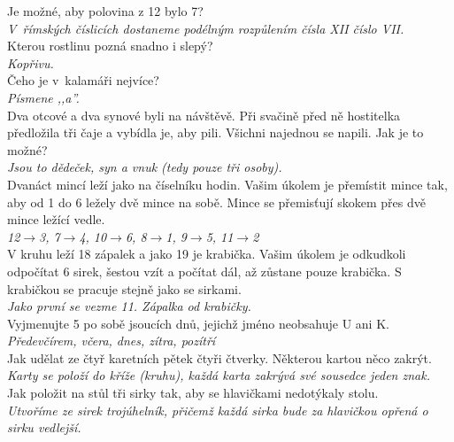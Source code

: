 \begin{multicols}{\value{columnsgames}}
\noindent
Je možné, aby polovina z 12 bylo 7?\\[1 mm]
{\sl V~římských číslicích dostaneme podélným rozpůlením 
čísla XII číslo VII.}\\

\noindent
Kterou rostlinu pozná snadno i slepý?\\[1 mm]
{\sl Kopřivu.}\\

\noindent
Čeho je v~kalamáři nejvíce?\\[1 mm]
{\sl Písmene ,,a''.}\\

\noindent
Dva otcové a dva synové byli na návštěvě. Při svačině 
před ně hostitelka předložila tři čaje a vybídla je, aby pili. 
Všichni najednou se napili. Jak je to možné?\\[1 mm]
{\sl Jsou to dědeček, syn a vnuk (tedy pouze tři osoby).}\\

\noindent
Dvanáct mincí leží jako na číselníku hodin. Vašim úkolem je 
přemístit mince tak, aby od 1 do 6 ležely dvě mince na sobě. 
Mince se přemisťují skokem přes dvě mince ležící vedle.\\[1 mm]
{\sl 12$\rightarrow$3, 7$\rightarrow$4, 10$\rightarrow$6, 8$\rightarrow$1, 
9$\rightarrow$5, 11$\rightarrow$2}\\

\noindent
V kruhu leží 18 zápalek a jako 19 je krabička. Vašim úkolem 
je odkudkoli odpočítat 6 sirek, šestou vzít a počítat dál, až 
zůstane pouze krabička. S krabičkou se pracuje stejně jako se 
sirkami.\\[1 mm]
{\sl Jako první se vezme 11. Zápalka od krabičky.}\\

\noindent
Vyjmenujte 5 po sobě jsoucích dnů, jejichž jméno neobsahuje 
U ani K.\\[1 mm]
{\sl Předevčírem, včera, dnes, zítra, pozítří}\\

\noindent
Jak udělat ze čtyř karetních pětek čtyři čtverky. Některou 
kartou něco zakrýt.\\[1 mm]
{\sl Karty se položí do kříže (kruhu), každá karta zakrývá své 
sousedce jeden znak.}\\

\noindent
Jak položit na stůl tři sirky tak, aby se hlavičkami 
nedotýkaly stolu.\\[1 mm]
{\sl Utvoříme ze sirek trojúhelník, přičemž každá sirka bude za 
hlavičkou opřená o sirku vedlejší.}\\


\end{multicols}
